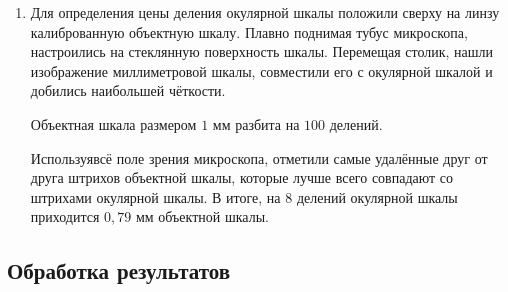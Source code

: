 \documentclass[a4paper,12pt]{article} %
\begin{document}
\begin{enumerate}
    \item Для определения цены деления окулярной шкалы положили сверху на линзу калиброванную объектную шкалу. Плавно поднимая тубус микроскопа, настроились на стеклянную поверхность шкалы. Перемещая столик, нашли изображение миллиметровой шкалы, совместили его с окулярной шкалой и добились наибольшей чёткости.

    Объектная шкала размером $1 \text{ мм}$ разбита на $100$ делений.

    Используявсё поле зрения микроскопа, отметили самые удалённые друг от друга штрихов объектной шкалы, которые лучше всего совпадают со штрихами окулярной шкалы. В итоге, на $8$ делений окулярной шкалы приходится $0,79\text{ мм}$ объектной шкалы.
\end{enumerate}

\subsection{Обработка результатов}
\end{document}
